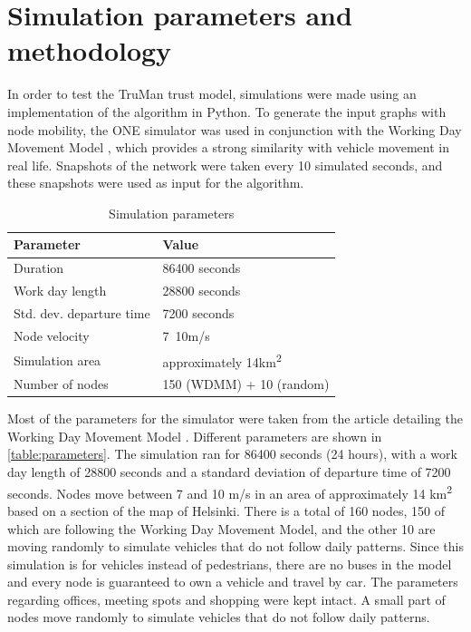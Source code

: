 \section{Simulation parameters and methodology}
\label{section:parameters}

In order to test the TruMan trust model, simulations were made using an implementation of the algorithm in Python.
To generate the input graphs with node mobility, the ONE simulator \cite{keranen2009one} was used in conjunction with the Working Day Movement Model \cite{ekman2008working}, which provides a strong similarity with vehicle movement in real life.
Snapshots of the network were taken every 10 simulated seconds, and these snapshots were used as input for the algorithm.

\begin{table}[h!]
\caption{Simulation parameters}
\label{table:parameters}
\centering
\begin{tabular}{|p{5cm}||p{5cm}|}
 \hline
 \textbf{Parameter}	& \textbf{Value} \\
 \hline
 \hline
 Duration 			& 86400 seconds \\
 \hline
 Work day length 	& 28800 seconds \\
 \hline
 Std. dev. departure time & 7200 seconds \\
 \hline
 Node velocity 		& 7~10m/s \\
 \hline
 Simulation area	& approximately 14km\textsuperscript{2} \\
 \hline
 Number of nodes 	& 150 (WDMM) + 10 (random) \\
 \hline
\end{tabular}
\end{table}

Most of the parameters for the simulator were taken from the article detailing the Working Day Movement Model \cite{ekman2008working}.
Different parameters are shown in \autoref{table:parameters}.
The simulation ran for 86400 seconds (24 hours), with a work day length of 28800 seconds and a standard deviation of departure time of 7200 seconds.
Nodes move between 7 and 10 m/s in an area of approximately 14 km\textsuperscript{2} based on a section of the map of Helsinki.
There is a total of 160 nodes, 150 of which are following the Working Day Movement Model, and the other 10 are moving randomly to simulate vehicles that do not follow daily patterns.
Since this simulation is for vehicles instead of pedestrians, there are no buses in the model and every node is guaranteed to own a vehicle and travel by car.
The parameters regarding offices, meeting spots and shopping were kept intact.
A small part of nodes move randomly to simulate vehicles that do not follow daily patterns.

